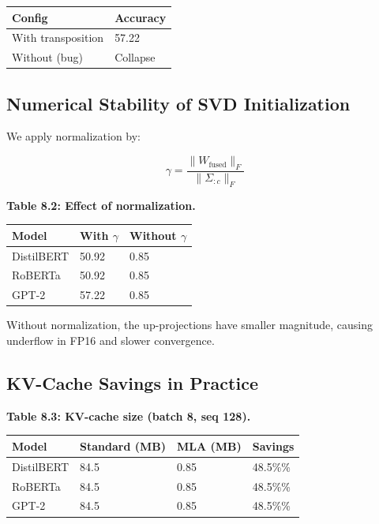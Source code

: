 \begin{table}[H]
\centering
\small
\begin{tabular}{ll}
\toprule
\textbf{Config} & \textbf{Accuracy} \\
\midrule
With transposition & 57.22 \\
Without (bug) & Collapse \\
\bottomrule
\end{tabular}
\end{table}

\subsection{Numerical Stability of SVD Initialization}

We apply normalization by:

\[
\gamma = \frac{\|W_\text{fused}\|_F}{\|\Sigma_{:c}\|_F}
\tag{8.1}
\]

\textbf{Table 8.2: Effect of normalization.}

\begin{table}[H]
\centering
\small
\begin{tabular}{lll}
\toprule
\textbf{Model} & \textbf{With $\gamma$} & \textbf{Without $\gamma$} \\
\midrule
DistilBERT & 50.92 & 0.85 \\
RoBERTa & 50.92 & 0.85 \\
GPT-2 & 57.22 & 0.85 \\
\bottomrule
\end{tabular}
\end{table}

Without normalization, the up-projections have smaller magnitude, causing 
underflow in FP16 and slower convergence.

\subsection{KV-Cache Savings in Practice}

\textbf{Table 8.3: KV-cache size (batch 8, seq 128).}

\begin{table}[H]
\centering
\small
\begin{tabular}{llll}
\toprule
\textbf{Model} & \textbf{Standard (MB)} & \textbf{MLA (MB)} & \textbf{Savings} \\
\midrule
DistilBERT & 84.5 & 0.85 & 48.5\%\% \\
RoBERTa & 84.5 & 0.85 & 48.5\%\% \\
GPT-2 & 84.5 & 0.85 & 48.5\%\% \\
\bottomrule
\end{tabular}
\end{table}

